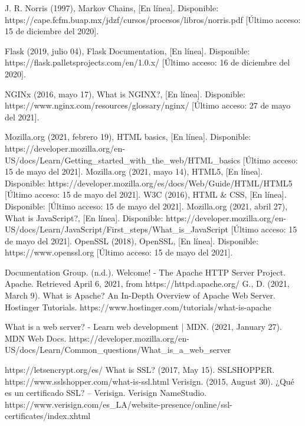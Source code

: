 \documentclass[12pt, a4paper, titlepage]{report}
\begin{document}
\begin{thebibliography}{20}
	J. R. Norris (1997), Markov Chains, [En línea]. Disponible: https://cape.fcfm.buap.mx/jdzf/cursos/procesos/libros/norris.pdf [Último acceso: 15 de diciembre del 2020].

	Flask (2019, julio 04), Flask Documentation, [En línea]. Disponible: https://flask.palletsprojects.com/en/1.0.x/ [Último acceso: 16 de diciembre del 2020].
	
	NGINx (2016, mayo 17), What is NGINX?,  [En línea]. Disponible: https://www.nginx.com/resources/glossary/nginx/ [Último acceso: 27 de mayo del 2021].
	
	
	Mozilla.org (2021, febrero 19), HTML basics, [En línea]. Disponible: https://developer.mozilla.org/en-US/docs/Learn/Getting\_started\_with\_the\_web/HTML\_basics [Último acceso: 15 de mayo del 2021].
	Mozilla.org (2021, mayo 14), HTML5, [En línea]. Disponible: https://developer.mozilla.org/es/docs/Web/Guide/HTML/HTML5 [Último acceso: 15 de mayo del 2021].
	W3C (2016), HTML \& CSS, [En línea]. Disponible:  [Último acceso: 15 de mayo del 2021].
	Mozilla.org (2021, abril 27), What is JavaScript?, [En línea]. Disponible: https://developer.mozilla.org/en-US/docs/Learn/JavaScript/First\_steps/What\_is\_JavaScript [Último acceso: 15 de mayo del 2021].
	OpenSSL (2018), OpenSSL, [En línea]. Disponible: https://www.openssl.org [Último acceso: 15 de mayo del 2021].
	
	Documentation Group. (n.d.). Welcome! - The Apache HTTP Server Project. Apache. Retrieved April 6, 2021, from https://httpd.apache.org/
	G., D. (2021, March 9). What is Apache? An In-Depth Overview of Apache Web Server. Hostinger Tutorials. https://www.hostinger.com/tutorials/what-is-apache
	
	What is a web server? - Learn web development | MDN. (2021, January 27). MDN Web Docs. https://developer.mozilla.org/en-US/docs/Learn/Common\_questions/What\_is\_a\_web\_server
	
	https://letsencrypt.org/es/
	What is SSL? (2017, May 15). SSLSHOPPER. https://www.sslshopper.com/what-is-ssl.html
	Verisign. (2015, August 30). ¿Qué es un certificado SSL? – Verisign. Verisign NameStudio. https://www.verisign.com/es\_LA/website-presence/online/ssl-certificates/index.xhtml


\end{thebibliography}
\end{document}
